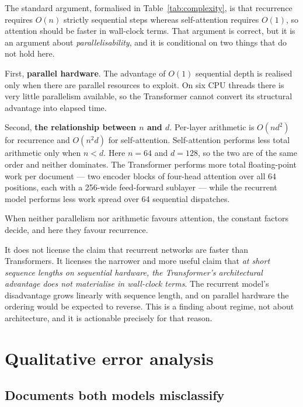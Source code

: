 
The standard argument, formalised in Table~\ref{tab:complexity}, is that recurrence requires $O(n)$
strictly sequential steps whereas self-attention requires $O(1)$, so attention should be faster in
wall-clock terms. That argument is correct, but it is an argument about \emph{parallelisability},
and it is conditional on two things that do not hold here.

First, \textbf{parallel hardware}. The advantage of $O(1)$ sequential depth is realised only when
there are parallel resources to exploit. On six CPU threads there is very little parallelism
available, so the Transformer cannot convert its structural advantage into elapsed time.

Second, \textbf{the relationship between $n$ and $d$}. Per-layer arithmetic is $O(n d^2)$ for
recurrence and $O(n^2 d)$ for self-attention. Self-attention performs less total arithmetic only
when $n < d$. Here $n = 64$ and $d = 128$, so the two are of the same order and neither dominates.
The Transformer performs more total floating-point work per document --- two encoder blocks of
four-head attention over all 64 positions, each with a 256-wide feed-forward sublayer --- while the
recurrent model performs less work spread over 64 sequential dispatches.

When neither parallelism nor arithmetic favours attention, the constant factors decide, and here
they favour recurrence.

 It does not license the claim that recurrent
networks are faster than Transformers. It licenses the narrower and more useful claim that
\emph{at short sequence lengths on sequential hardware, the Transformer's architectural advantage
does not materialise in wall-clock terms}. The recurrent model's disadvantage grows linearly with
sequence length, and on parallel hardware the ordering would be expected to reverse. This is a
finding about regime, not about architecture, and it is actionable precisely for that reason.

\section{Qualitative error analysis}

\subsection{Documents both models misclassify}

